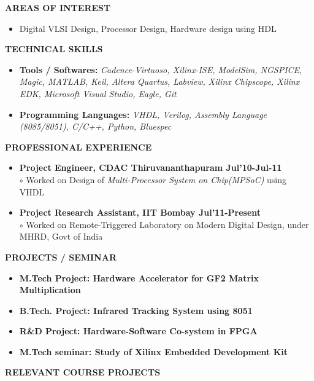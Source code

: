 \documentclass[a4paper,10pt]{article}
\begin{document}
 \colorbox{titleColor}{\parbox{6.5in}{\textbf{AREAS OF INTEREST}}}
 \begin{itemize}
  \setlength{\itemsep}{1pt}
  \item {{  Digital VLSI Design, Processor Design, Hardware design using HDL}}
 \end{itemize}
 \colorbox{titleColor}{\parbox{6.5in}{\textbf{TECHNICAL SKILLS}}}
 \begin{itemize}
  \setlength{\itemsep}{1pt}
  \item \textbf{{Tools / Softwares:}} \textit{Cadence-Virtuoso, Xilinx-ISE, ModelSim, NGSPICE, Magic, MATLAB, Keil, Altera Quartus, Labview, Xilinx Chipscope, Xilinx EDK, Microsoft Visual Studio, Eagle, Git}
  \item \textbf{{Programming Languages:}} \textit{VHDL, Verilog, Assembly Language (8085/8051), C/C++, Python, Bluespec}
 \end{itemize}
  \colorbox{titleColor}{\parbox{6.5in}{\textbf{PROFESSIONAL EXPERIENCE}}}
  \begin{itemize}
  \item \textbf{Project Engineer, CDAC Thiruvananthapuram \qquad\qquad\qquad\quad\qquad\qquad\qquad Jul'10-Jul-11}\\
  $\circ$  Worked on  Design of \textit{Multi-Processor System on Chip(MPSoC)} using VHDL
  \item \textbf{Project Research Assistant, IIT Bombay 	\qquad\qquad\qquad\qquad\quad\qquad\qquad\qquad Jul'11-Present}\\
  $\circ$ Worked on Remote-Triggered Laboratory on Modern Digital Design, under MHRD, Govt of India\\
  \end{itemize}
 \colorbox{titleColor}{\parbox{6.5in}{\textbf{PROJECTS / SEMINAR}}}
 \begin{itemize}
 \item \textbf{M.Tech Project: Hardware Accelerator for GF2 Matrix Multiplication } 
  \item \textbf{{B.Tech. Project: Infrared Tracking System using 8051}}  %
  \item \textbf{{R\&D Project: Hardware-Software Co-system in FPGA}}
  \item \textbf{{M.Tech seminar: Study of Xilinx Embedded Development Kit}}
 \end{itemize}
 \colorbox{titleColor}{\parbox{6.5in}{\textbf{RELEVANT COURSE PROJECTS}}}
\end{document}
